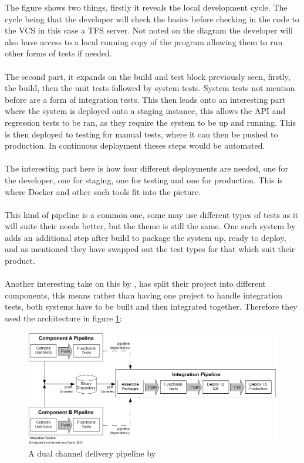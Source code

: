 The figure shows two things, firstly it reveals the local development cycle. The cycle being that the developer will check the basics before checking in the code to the VCS in this case a TFS server. Not noted on the diagram the developer will also have access to a local running copy of the program allowing them to run other forms of tests if needed. 
\\\\
The second part, it expands on the build and test block previously seen, firstly, the build, then the unit tests followed by system tests. System tests not mention before are a form of integration tests. This then leads onto an interesting part where the system is deployed onto a staging instance, this allows the API and regression tests to be ran, as they require the system to be up and running. This is then deployed to testing  for manual tests, where it can then be pushed to production. In continuous deployment theses steps would be automated.
\\\\
The interesting part here is how four different deployments are needed, one for the developer, one for staging, one for testing and one for production. This is where Docker and other such tools fit into the picture.
\\\\
This kind of pipeline is a common one, some may use different types of tests as it will suite their needs better, but the theme is still the same. One such system by \cite{zend} adds an additional step after build to package the system up, ready to deploy, and as mentioned they have swapped out the test types for that which suit their product.
\\\\
Another interesting take on this by \cite{codeahoy}, has split their project into different components, this means rather than having one project to handle integration tests, both systems have to be built and then integrated together. Therefore they used the architecture in figure \ref{fig:codeahoy}:

\begin{figure}[H]
	\centering
	\includegraphics[scale=0.5]{images/codeahoy.png}
	\caption{A dual channel delivery pipeline by \cite{codeahoy}}
	\label{fig:codeahoy}
\end{figure}

